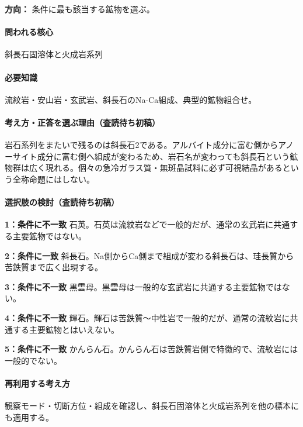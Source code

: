 \noindent\textbf{方向：} 条件に最も該当する鉱物を選ぶ。\par

\paragraph{問われる核心} 斜長石固溶体と火成岩系列

\paragraph{必要知識} 流紋岩・安山岩・玄武岩、斜長石のNa-Ca組成、典型的鉱物組合せ。

\paragraph{考え方・正答を選ぶ理由（査読待ち初稿）} 岩石系列をまたいで残るのは斜長石2である。アルバイト成分に富む側からアノーサイト成分に富む側へ組成が変わるため、岩石名が変わっても斜長石という鉱物群は広く現れる。個々の急冷ガラス質・無斑晶試料に必ず可視結晶があるという全称命題にはしない。

\paragraph{選択肢の検討（査読待ち初稿）}\mbox{}\par

\noindent\textbf{1：条件に不一致} 石英。石英は流紋岩などで一般的だが、通常の玄武岩に共通する主要鉱物ではない。\par

\noindent\textbf{2：条件に一致} 斜長石。Na側からCa側まで組成が変わる斜長石は、珪長質から苦鉄質まで広く出現する。\par

\noindent\textbf{3：条件に不一致} 黒雲母。黒雲母は一般的な玄武岩に共通する主要鉱物ではない。\par

\noindent\textbf{4：条件に不一致} 輝石。輝石は苦鉄質〜中性岩で一般的だが、通常の流紋岩に共通する主要鉱物とはいえない。\par

\noindent\textbf{5：条件に不一致} かんらん石。かんらん石は苦鉄質岩側で特徴的で、流紋岩には一般的でない。\par

\paragraph{再利用する考え方} 観察モード・切断方位・組成を確認し、斜長石固溶体と火成岩系列を他の標本にも適用する。

